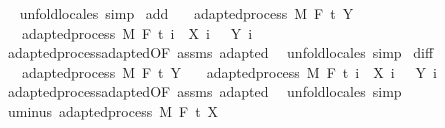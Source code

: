 \begin{isabellebody}
\isadelimproof
\ %
\endisadelimproof
%
\isatagproof
{}\isamarkupfalse%
\ {\isacharparenleft}{\kern0pt}unfold{\isacharunderscore}{\kern0pt}locales{\isacharparenright}{\kern0pt}\ simp%
\endisatagproof
{\isafoldproof}%
%
\isadelimproof
%
\endisadelimproof
\isanewline
\isanewline
{}\isamarkupfalse%
\ add{\isacharcolon}{\kern0pt}\isanewline
\ \ \ {\isachardoublequoteopen}adapted{\isacharunderscore}{\kern0pt}process\ M\ F\ t\ Y{\isachardoublequoteclose}\isanewline
\ \ \ {\isachardoublequoteopen}adapted{\isacharunderscore}{\kern0pt}process\ M\ F\ t\ {\isacharparenleft}{\kern0pt}{\isasymlambda}i\ {\isasymxi}{\isachardot}{\kern0pt}\ X\ i\ {\isasymxi}\ {\isacharplus}{\kern0pt}\ Y\ i\ {\isasymxi}{\isacharparenright}{\kern0pt}{\isachardoublequoteclose}\isanewline
%
\isadelimproof
\ \ %
\endisadelimproof
%
\isatagproof
{}\isamarkupfalse%
\ adapted{\isacharunderscore}{\kern0pt}process{\isachardot}{\kern0pt}adapted{\isacharbrackleft}{\kern0pt}OF\ assms{\isacharbrackright}{\kern0pt}\ adapted\ \isamarkupfalse%
\ {\isacharparenleft}{\kern0pt}unfold{\isacharunderscore}{\kern0pt}locales{\isacharparenright}{\kern0pt}\ simp%
\endisatagproof
{\isafoldproof}%
%
\isadelimproof
\isanewline
%
\endisadelimproof
\isanewline
{}\isamarkupfalse%
\ diff{\isacharcolon}{\kern0pt}\isanewline
\ \ \ {\isachardoublequoteopen}adapted{\isacharunderscore}{\kern0pt}process\ M\ F\ t\ Y{\isachardoublequoteclose}\isanewline
\ \ \ {\isachardoublequoteopen}adapted{\isacharunderscore}{\kern0pt}process\ M\ F\ t\ {\isacharparenleft}{\kern0pt}{\isasymlambda}i\ {\isasymxi}{\isachardot}{\kern0pt}\ X\ i\ {\isasymxi}\ {\isacharminus}{\kern0pt}\ Y\ i\ {\isasymxi}{\isacharparenright}{\kern0pt}{\isachardoublequoteclose}\isanewline
%
\isadelimproof
\ \ %
\endisadelimproof
%
\isatagproof
{}\isamarkupfalse%
\ adapted{\isacharunderscore}{\kern0pt}process{\isachardot}{\kern0pt}adapted{\isacharbrackleft}{\kern0pt}OF\ assms{\isacharbrackright}{\kern0pt}\ adapted\ \isamarkupfalse%
\ {\isacharparenleft}{\kern0pt}unfold{\isacharunderscore}{\kern0pt}locales{\isacharparenright}{\kern0pt}\ simp%
\endisatagproof
{\isafoldproof}%
%
\isadelimproof
\isanewline
%
\endisadelimproof
\isanewline
{}\isamarkupfalse%
\ uminus{\isacharcolon}{\kern0pt}\ {\isachardoublequoteopen}adapted{\isacharunderscore}{\kern0pt}process\ M\ F\ t\ {\isacharparenleft}{\kern0pt}{\isacharminus}{\kern0pt}X{\isacharparenright}{\kern0pt}{\isachardoublequoteclose}%

\end{isabellebody}
